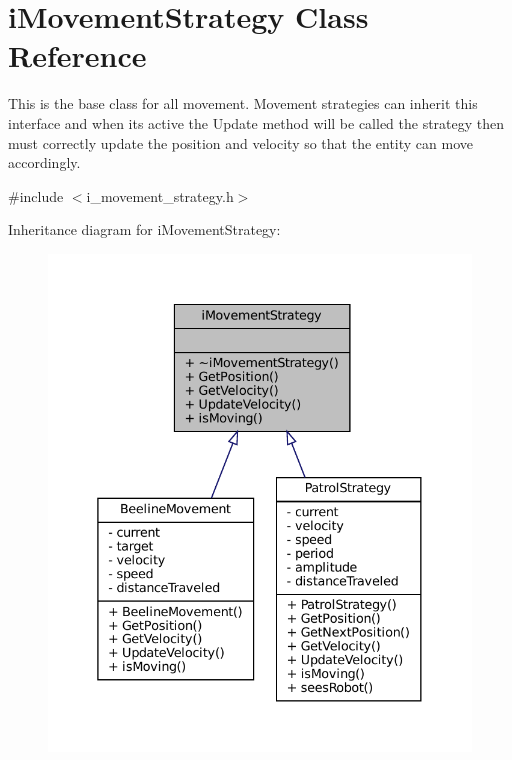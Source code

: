 \hypertarget{classiMovementStrategy}{}\section{i\+Movement\+Strategy Class Reference}
\label{classiMovementStrategy}


This is the base class for all movement. Movement strategies can inherit this interface and when it\textquotesingle{}s active the Update method will be called the strategy then must correctly update the position and velocity so that the entity can move accordingly.  




{\ttfamily \#include $<$i\+\_\+movement\+\_\+strategy.\+h$>$}



Inheritance diagram for i\+Movement\+Strategy\+:\nopagebreak
\begin{figure}[H]
\begin{center}
\leavevmode
\includegraphics[width=338pt]{classiMovementStrategy__inherit__graph}
\end{center}
\end{figure}


